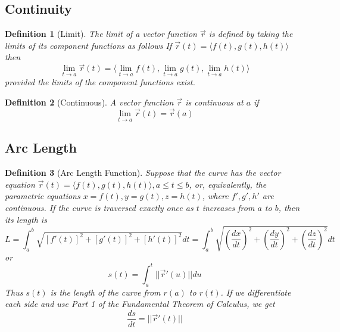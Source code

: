 \documentclass[10pt]{report}
\newtheorem{def3}{Definition}[subsection]
\begin{document}
\subsection{Continuity}
\begin{def3}[Limit]
The limit of a vector function $\vec{r}$ is defined by taking the limits of its component functions as follows
If $\vec{r}(t) = \langle f(t), g(t) ,h(t) \rangle$ then
$$ \lim_{t\to a} \vec{r}(t) = \langle \lim_{t\to a} f(t),\lim_{t\to a} g(t), \lim_{t\to a} h(t) \rangle$$
provided the limits of the component functions exist.
\end{def3}
\begin{def3}[Continuous]
A vector function $\vec{r}$ is continuous at $a$ if
$$\lim_{t\to a} \vec{r}(t) = \vec{r}(a)$$
\end{def3}
\subsection{Arc Length}
\begin{def3}[Arc Length Function]
Suppose that the curve has the vector equation $\vec{r}(t) = \langle f(t), g(t), h(t) \rangle, a\leq t \leq b$, or, equivalently, the parametric equations $x=f(t), y=g(t), z=h(t)$, where $f',g',h'$ are continuous. If the curve is traversed exactly once as $t$ increases from $a$ to $b$, then its length is 
$$L = \int_a^b \sqrt{[f'(t)]^2+[g'(t)]^2+[h'(t)]^2}dt = \int_a^b \sqrt{\left(\frac{dx}{dt}\right)^2+\left(\frac{dy}{dt}\right)^2+\left(\frac{dz}{dt}\right)^2}dt$$
or
$$s(t) = \int_a^t ||\vec{r}'(u)||du$$
Thus $s(t)$ is the length of the curve from $r(a)$ to $r(t)$. If we differentiate each side and use Part 1 of the Fundamental Theorem of Calculus, we get
$$\frac{ds}{dt}=||\vec{r}'(t)||$$
\end{def3}
\end{document}
